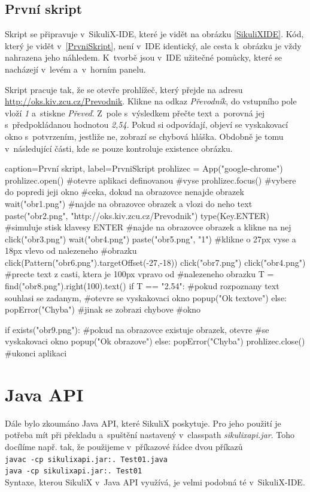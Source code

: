 \documentclass{bakalarka}
\begin{document}
		\subsection{První skript}
		Skript se připravuje v~SikuliX-IDE, které je vidět na obrázku \ref{SikuliXIDE}. Kód, který je vidět v~\ref{PrvniSkript}, není v~IDE identický, ale cesta k~obrázku je vždy nahrazena jeho náhledem. K~tvorbě jsou v~IDE užitečné pomůcky, které se nacházejí v~levém a~v~horním panelu.
		
		Skript pracuje tak, že se otevře prohlížeč, který přejde na adresu \url{http://oks.kiv.zcu.cz/Prevodnik}. Klikne na odkaz \emph{Převodník}, do vstupního pole vloží \emph{1} a~stiskne \emph{Převeď}. Z~pole s~výsledkem přečte text a~porovná jej s~předpokládanou hodnotou \emph{2,54}. Pokud si odpovídají, objeví se vyskakovací okno s~potvrzením, jestliže ne, zobrazí se chybová hláška. Obdobně je tomu v~následující části, kde se pouze kontroluje existence obrázku.\newpage
		\begin{lstpython}{caption={První skript}, label={PrvniSkript}}
prohlizec = App("google-chrome")
prohlizec.open()	#otevre aplikaci definovanou
				#vyse
prohlizec.focus()	#vybere do popredi jeji okno
#ceka, dokud na obrazovce nenajde obrazek
wait("obr1.png")
#najde na obrazovce obrazek a vlozi do neho text
paste("obr2.png", "http://oks.kiv.zcu.cz/Prevodnik")
type(Key.ENTER)	#simuluje stisk klavesy ENTER
#najde na obrazovce obrazek a klikne na nej
click("obr3.png")
wait("obr4.png")
paste("obr5.png", "1")
#klikne o 27px vyse a 18px vlevo od nalezeneho
#obrazku
click(Pattern("obr6.png").targetOffset(-27,-18))
click("obr7.png")
click("obr4.png")
#precte text z casti, ktera je 100px vpravo od
#nalezeneho obrazku
T = find("obr8.png").right(100).text()
if T == "2.54":
	#pokud rozpoznany text souhlasi se zadanym,
	#otevre se vyskakovaci okno
    popup("Ok textove")
else:
    popError("Chyba")    #jinak se zobrazi chybove
    			 #okno

if exists("obr9.png"):
	#pokud na obrazovce existuje obrazek, otevre
	#se vyskakovaci okno
    popup("Ok obrazove")
else:
    popError("Chyba")
prohlizec.close()    #ukonci aplikaci
		\end{lstpython}
		
	\section{Java API}
	Dále bylo zkoumáno Java API, které SikuliX poskytuje. Pro jeho použití je potřeba mít při překladu a~spuštění nastavený v~classpath \emph{sikulixapi.jar}. Toho docílíme např. tak, že použijeme v~příkazové řádce dvou příkazů\\\texttt{javac -cp sikulixapi.jar:. Test01.java}\\\texttt{java -cp sikulixapi.jar:. Test01}\\ Syntaxe, kterou SikuliX v~Java API využívá, je velmi podobná té v~SikuliX-IDE.
	
\end{document}
